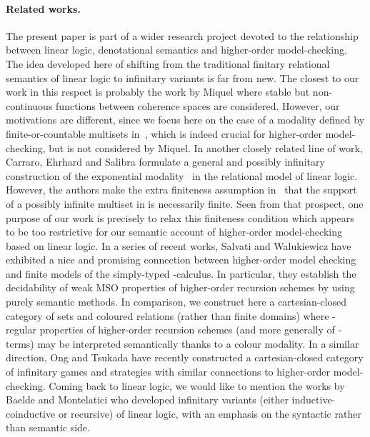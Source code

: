 \documentclass[runningheads,a4paper]{llncs}
\begin{document}
\paragraph*{Related works.}
The present paper is part of a wider research project devoted to the relationship 
between linear logic, denotational semantics and higher-order model-checking.
The idea developed here of shifting from the traditional finitary relational semantics
of linear logic to infinitary variants is far from new.
The closest to our work in this respect is probably the work by Miquel \cite{these-miquel}
where stable but non-continuous functions between coherence spaces are considered.
However, our motivations are different, since we focus here on the case 
of a modality  defined by finite-or-countable multisets in~, 
which is indeed crucial for higher-order model-checking, but is not considered by Miquel.
In another closely related line of work, Carraro, Ehrhard and Salibra \cite{carraro-ehrhard-salibra}
formulate a general and possibly infinitary construction of the exponential modality~
in the relational model of linear logic.
However, the authors make the extra finiteness assumption in~\cite{carraro-ehrhard-salibra}
that the support of a possibly infinite multiset in  is necessarily finite.
Seen from that prospect, one purpose of our work is precisely to relax this finiteness condition which
appears to be too restrictive for our semantic account of higher-order model-checking
based on linear logic.
In a series of recent works,
Salvati and Walukiewicz \cite{salvati-walukiewicz2} \cite{salvati-walukiewicz3} have exhibited
a nice and promising connection between  higher-order model checking
and finite models of the simply-typed -calculus.
In particular, they establish the decidability of weak MSO properties of higher-order recursion schemes
by using purely semantic methods.
In comparison, we construct here a cartesian-closed category of sets and coloured relations
(rather than finite domains) where -regular properties of higher-order recursion schemes
(and more generally of -terms) may be interpreted semantically thanks to a colour modality.
In a similar direction, Ong and Tsukada \cite{ong-tsukada} have recently constructed
a cartesian-closed category of infinitary games and strategies with similar connections
to higher-order model-checking.
Coming back to linear logic,
we would like to mention the works by Baelde \cite{baelde} and Montelatici \cite{montelatici}
who developed infinitary variants (either inductive-coinductive or recursive) of linear logic,
with an emphasis on the syntactic rather than semantic side.
\end{document}
